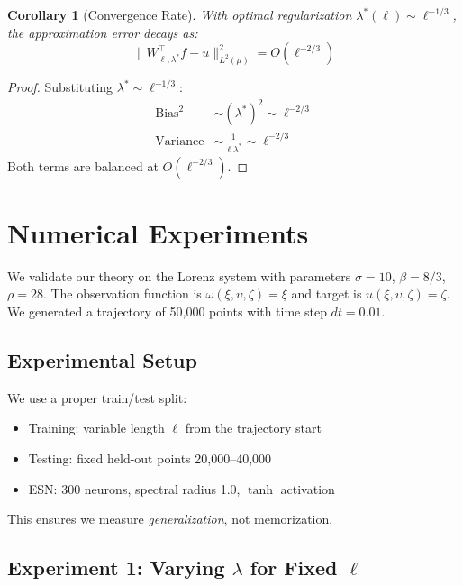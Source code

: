 \documentclass[11pt]{article}
\newtheorem{corollary}[theorem]{Corollary}
\theoremstyle{definition}
\theoremstyle{remark}
\begin{document}
\begin{corollary}[Convergence Rate]
\label{cor:convergence_rate}
With optimal regularization $\lambda^*(\ell) \sim \ell^{-1/3}$, the approximation error decays as:
\begin{equation}
\|W_{\ell,\lambda^*}^\top f - u\|_{L^2(\mu)}^2 = O(\ell^{-2/3})
\end{equation}
\end{corollary}

\begin{proof}
Substituting $\lambda^* \sim \ell^{-1/3}$:
\begin{align}
\text{Bias}^2 &\sim (\lambda^*)^2 \sim \ell^{-2/3} \\
\text{Variance} &\sim \frac{1}{\ell \lambda^*} \sim \ell^{-2/3}
\end{align}
Both terms are balanced at $O(\ell^{-2/3})$.
\end{proof}

\section{Numerical Experiments}

We validate our theory on the Lorenz system with parameters $\sigma=10$, $\beta=8/3$, $\rho=28$. The observation function is $\omega(\xi,\upsilon,\zeta) = \xi$ and target is $u(\xi,\upsilon,\zeta) = \zeta$. We generated a trajectory of 50,000 points with time step $dt=0.01$.

\subsection{Experimental Setup}

We use a proper train/test split:
\begin{itemize}
\item Training: variable length $\ell$ from the trajectory start
\item Testing: fixed held-out points 20,000--40,000
\item ESN: 300 neurons, spectral radius 1.0, $\tanh$ activation
\end{itemize}

This ensures we measure \textit{generalization}, not memorization.

\subsection{Experiment 1: Varying $\lambda$ for Fixed $\ell$}
\end{document}

